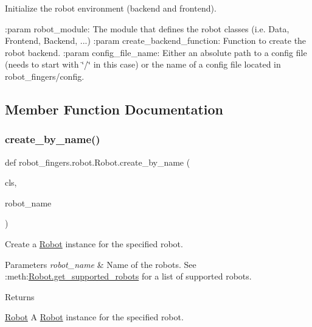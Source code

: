 Initialize the robot environment (backend and frontend). 

\+:param robot\+\_\+module\+: The module that defines the robot classes (i.\+e. {\ttfamily Data}, {\ttfamily Frontend}, {\ttfamily Backend}, ...) \+:param create\+\_\+backend\+\_\+function\+: Function to create the robot backend. \+:param config\+\_\+file\+\_\+name\+: Either an absolute path to a config file (needs to start with \char`\"{}/\char`\"{} in this case) or the name of a config file located in robot\+\_\+fingers/config. 

\subsection{Member Function Documentation}
\mbox{\label{classrobot__fingers_1_1robot_1_1Robot_ab861541dfe9f4689d9c3f842b2cd8a4e}} 
\subsubsection{\texorpdfstring{create\+\_\+by\+\_\+name()}{create\_by\_name()}}
{\footnotesize\ttfamily def robot\+\_\+fingers.\+robot.\+Robot.\+create\+\_\+by\+\_\+name (\begin{DoxyParamCaption}\item[{}]{cls,  }\item[{}]{robot\+\_\+name }\end{DoxyParamCaption})}



Create a {\ttfamily \hyperlink{classrobot__fingers_1_1robot_1_1Robot}{Robot}} instance for the specified robot. 


\begin{DoxyParams}{Parameters}
{\em robot\+\_\+name} & Name of the robots. See \+:meth\+:{\ttfamily \hyperlink{classrobot__fingers_1_1robot_1_1Robot_ae4d1f723105c1d3c00c49db2e7c283ae}{Robot.\+get\+\_\+supported\+\_\+robots}} for a list of supported robots.\\
\hline
\end{DoxyParams}
\begin{DoxyReturn}{Returns}


\hyperlink{classrobot__fingers_1_1robot_1_1Robot}{Robot} A {\ttfamily \hyperlink{classrobot__fingers_1_1robot_1_1Robot}{Robot}} instance for the specified robot. 
\end{DoxyReturn}
\mbox{\label{classrobot__fingers_1_1robot_1_1Robot_ae4d1f723105c1d3c00c49db2e7c283ae}} 
